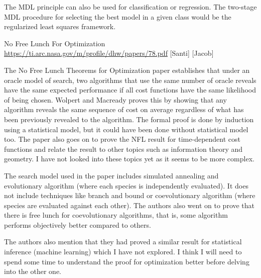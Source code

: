 \documentclass[12pt]{article}
\begin{document}
The MDL principle can also be used for classiﬁcation or regression. The two-stage MDL procedure for selecting the best model in a given class would be the regularized least squares framework.

No Free Lunch For Optimization
\url{https://ti.arc.nasa.gov/m/profile/dhw/papers/78.pdf} [Santi] [Jacob]	

The No Free Lunch Theorems for Optimization paper establishes that under an oracle model of search, two algorithms that use the same number of oracle reveals have the same expected performance if all cost functions have the same likelihood of being chosen. Wolpert and Macready proves this by showing that any algorithm reveals the same sequence of cost on average regardless of what has been previously revealed to the algorithm. The formal proof is done by induction using a statistical model, but it could have been done without statistical model too. The paper also goes on to prove the NFL result for time-dependent cost functions and relate the result to other topics such as information theory and geometry. I have not looked into these topics yet as it seems to be more complex.

The search model used in the paper includes simulated annealing and evolutionary algorithm (where each species is independently evaluated). It does not include techniques like branch and bound or coevolutionary algorithm (where species are evaluated against each other). The authors also went on to prove that there is free lunch for coevolutionary algorithms, that is, some algorithm performs objectively better compared to others.

The authors also mention that they had proved a similar result for statistical inference (machine learning) which I have not explored. I think I will need to spend some time to understand the proof for optimization better before delving into the other one.
\end{document}
